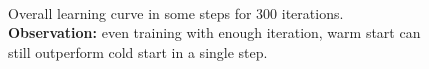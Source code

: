 \begin{figure}[htbp]
\centering
{}
\\
\caption{Overall learning curve in some steps for 300 iterations. \textbf{Observation:} even training with enough iteration, warm start can still outperform cold start in a single step.}
\label{fig:errdiff}
\end{figure}
